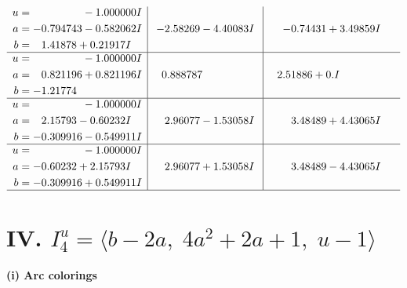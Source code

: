 \documentclass[1p]{elsarticle_modified}
\theoremstyle{definition}
\begin{document}
$$\begin{array}{c|c|c}
\begin{aligned}
u &= \phantom{-0.000000 } -1.000000 I \\
a &= -0.794743 - 0.582062 I \\
b &= \phantom{-}1.41878 + 0.21917 I\end{aligned}
 & -2.58269 - 4.40083 I & -0.74431 + 3.49859 I \\ \hline\begin{aligned}
u &= \phantom{-0.000000 } -1.000000 I \\
a &= \phantom{-}0.821196 + 0.821196 I \\
b &= -1.21774\phantom{ +0.000000I}\end{aligned}
 & \phantom{-}0.888787\phantom{ +0.000000I} & \phantom{-}2.51886 + 0. I\phantom{ +0.000000I} \\ \hline\begin{aligned}
u &= \phantom{-0.000000 } -1.000000 I \\
a &= \phantom{-}2.15793 - 0.60232 I \\
b &= -0.309916 - 0.549911 I\end{aligned}
 & \phantom{-}2.96077 - 1.53058 I & \phantom{-}3.48489 + 4.43065 I \\ \hline\begin{aligned}
u &= \phantom{-0.000000 } -1.000000 I \\
a &= -0.60232 + 2.15793 I \\
b &= -0.309916 + 0.549911 I\end{aligned}
 & \phantom{-}2.96077 + 1.53058 I & \phantom{-}3.48489 - 4.43065 I\\
 \hline 
 \end{array}$$\newpage\newpage\renewcommand{\arraystretch}{1}
\centering \section*{IV. $I^u_{4}= \langle b-2 a,\;4 a^2+2 a+1,\;u-1 \rangle$}
\flushleft \textbf{(i) Arc colorings}\\
\end{document}
